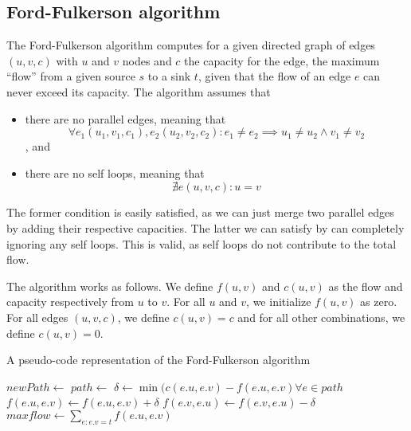 \documentclass[10pt,a4paper,hidelinks]{article}
\begin{document}
\subsection{Ford-Fulkerson algorithm}

The Ford-Fulkerson algorithm computes for a given directed graph of edges $(u, v, c)$ with $u$ and $v$ nodes and $c$ the capacity for the edge, the maximum ``flow'' from a given source $s$ to a sink $t$, given that the flow of an edge $e$ can never exceed its capacity. The algorithm assumes that

\begin{itemize}
\item there are no parallel edges, meaning that 
$$
\forall e_1 (u_1, v_1, c_1), e_2(u_2, v_2, c_2): e_1 \neq e_2 \implies u_1 \neq u_2 \land v_1 \neq v_2
$$, and
\item there are no self loops, meaning that
$$
\nexists e (u, v, c): u = v
$$
\end{itemize}

The former condition is easily satisfied, as we can just merge two parallel edges by adding their respective capacities. The latter we can satisfy by can completely ignoring any self loops. This is valid, as self loops do not contribute to the total flow.

The algorithm works as follows. We define $f(u,v)$ and $c(u, v)$ as the flow and capacity respectively from $u$ to $v$. For all $u$ and $v$, we initialize $f(u, v)$ as zero. For all edges $(u, v, c)$, we define $c(u, v) = c$ and for all other combinations, we define $c(u, v) = 0$.

\begin{algorithm}
\caption{A pseudo-code representation of the Ford-Fulkerson algorithm}
\label{algo:ford-fulkerson}
\begin{algorithmic}

		\State {}
	\Else
			\State $newPath \gets$ 
				\State {}
			\EndIf
		\EndFor
		\State \Return{$\emptyset$}
	\EndIf
\EndFunction
\State
{}
	\State $path \gets$ 
	\State $\delta \gets \min(c(e.u, e.v) - f(e.u, e.v) \forall e \in path$
		\State $f(e.u, e.v) \gets f(e.u, e.v) + \delta$
		\State $f(e.v, e.u) \gets f(e.v, e.u) - \delta$
	\EndFor
\EndWhile
\State $maxflow \gets \sum\limits_{e : e.v = t} f(e.u, e.v)$
	
\end{algorithmic}
\end{algorithm}
\end{document}
